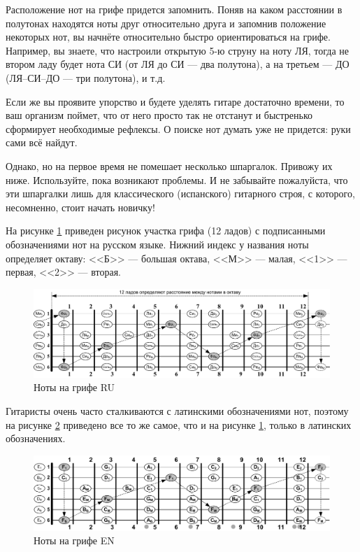 Расположение нот на грифе придется запомнить. Поняв на каком расстоянии в полутонах находятся ноты друг относительно друга и запомнив положение некоторых нот, вы начнёте относительно быстро ориентироваться на грифе. Например, вы знаете, что настроили открытую 5-ю струну на ноту ЛЯ, тогда не втором ладу будет нота СИ (от ЛЯ до СИ --- два полутона), а на третьем --- ДО (ЛЯ--СИ--ДО --- три полутона), и т.д.

Если же вы проявите упорство и будете уделять гитаре достаточно времени, то ваш организм поймет, что от него просто так не отстанут и быстренько сформирует необходимые рефлексы. О поиске нот думать уже не придется: руки сами всё найдут. 

Однако, но на первое время не помешает несколько шпаргалок. Привожу их ниже. Используйте, пока возникают проблемы. И не забывайте пожалуйста, что эти шпаргалки лишь для классического (испанского) гитарного строя, с которого, несомненно, стоит начать новичку!

На рисунке \ref{fig:guitar:notes-on-griph-ru} приведен рисунок участка грифа (12 ладов) с подписанными обозначениями нот на русском языке. Нижний индекс у названия ноты определяет октаву: <<Б>> --- большая октава, <<М>> --- малая, <<1>> --- первая, <<2>> --- вторая.

\begin{figure}[!ht]
    \centering
    \includegraphics[width=\textwidth]{fig/notes-on-griph-ru} 
    \caption{Ноты на грифе RU}\label{fig:guitar:notes-on-griph-ru}
\end{figure} 

Гитаристы очень часто сталкиваются с латинскими обозначениями нот, поэтому на рисунке \ref{fig:guitar:notes-on-griph-lat} приведено все то же самое, что и на рисунке \ref{fig:guitar:notes-on-griph-ru}, только в латинских обозначениях.

\begin{figure}[!ht]
    \centering
    \includegraphics[width=\textwidth]{fig/notes-on-griph-lat} 
    \caption{Ноты на грифе EN}\label{fig:guitar:notes-on-griph-lat}
\end{figure} 

